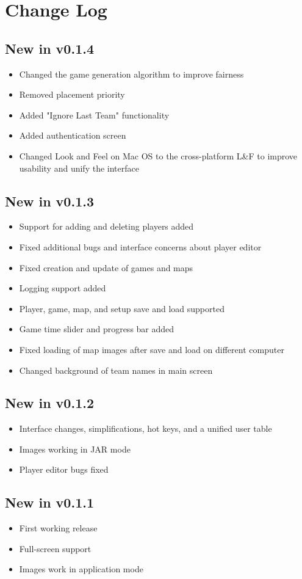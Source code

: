 \documentclass[10pt,a4paper]{report}
\begin{document}
\chapter{Change Log}
\section{New in v0.1.4}
\begin{itemize}
\item Changed the game generation algorithm to improve fairness
\item Removed placement priority
\item Added "Ignore Last Team" functionality
\item Added authentication screen
\item Changed Look and Feel on Mac OS to the cross-platform L\&F to improve usability and unify the interface
\end{itemize}
\section{New in v0.1.3}
\begin{itemize}
\item Support for adding and deleting players added
\item Fixed additional bugs and interface concerns about player editor
\item Fixed creation and update of games and maps
\item Logging support added
\item Player, game, map, and setup save and load supported
\item Game time slider and progress bar added
\item Fixed loading of map images after save and load on different computer
\item Changed background of team names in main screen
\end{itemize}
\section{New in v0.1.2}
\begin{itemize}
\item Interface changes, simplifications, hot keys, and a unified user table
\item Images working in JAR mode
\item Player editor bugs fixed
\end{itemize}
\section{New in v0.1.1}
\begin{itemize}
\item First working release
\item Full-screen support
\item Images work in application mode
\end{itemize}
\end{document}
